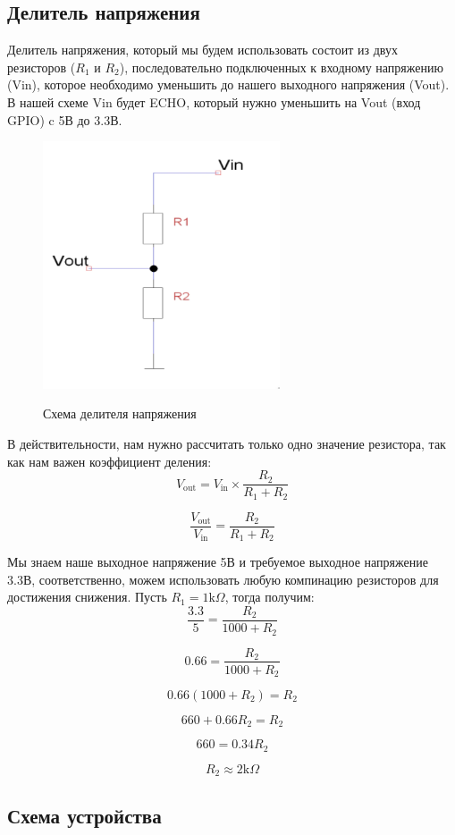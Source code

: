 \documentclass[a4paper, 14pt]{article}
\begin{document}
\subsection{Делитель напряжения}

Делитель напряжения, который мы будем использовать состоит из двух резисторов ($R_1$ и $R_2$), последовательно подключенных к входному напряжению (Vin), которое необходимо уменьшить до нашего выходного напряжения (Vout). В нашей схеме Vin будет ECHO, который нужно уменьшить на Vout (вход GPIO) c 5В до 3.3В.

\begin{figure}[H]
	\centering
	\includegraphics[width=7cm]{screenshots/2.png}\\
	\caption{Схема делителя напряжения}
\end{figure}

В действительности, нам нужно рассчитать только одно значение резистора, так как нам важен коэффициент деления:
$$V_\text{out} = V_\text{in} \times \frac{R_2}{R_1 + R_2}$$

$$\frac{V_\text{out}}{V_\text{in}} = \frac{R_2}{R_1+R_2}$$

Мы знаем наше выходное напряжение 5В и требуемое выходное напряжение 3.3В, соответственно, можем использовать любую компинацию резисторов для достижения снижения. Пусть $R_1 = 1\text{k}\Omega$, тогда получим:
$$\frac{3.3}{5}=\frac{R_2}{1000+R_2}$$

$$0.66=\frac{R_2}{1000+R_2}$$

$$0.66(1000+R_2) = R_2$$

$$660 + 0.66R_2 = R_2$$

$$660 = 0.34R_2$$

$$R_2 \approx 2\text{k}\Omega$$

\subsection{Схема устройства}
\end{document}
